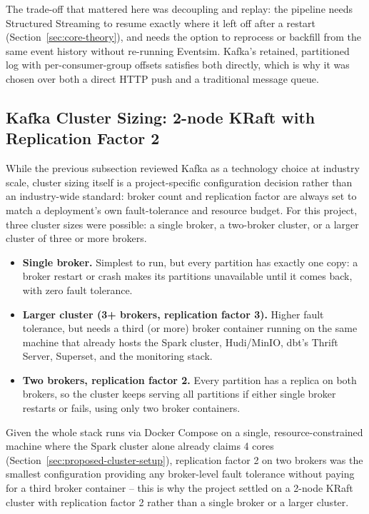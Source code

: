 The trade-off that mattered here was decoupling and replay: the pipeline needs Structured Streaming to resume exactly where it left off after a restart (Section~\ref{sec:core-theory}), and needs the option to reprocess or backfill from the same event history without re-running Eventsim. Kafka's retained, partitioned log with per-consumer-group offsets satisfies both directly, which is why it was chosen over both a direct HTTP push and a traditional message queue.

\subsection{Kafka Cluster Sizing: 2-node KRaft with Replication Factor 2}
\label{sec:kafka-sizing}

While the previous subsection reviewed Kafka as a technology choice at industry scale, cluster sizing itself is a project-specific configuration decision rather than an industry-wide standard: broker count and replication factor are always set to match a deployment's own fault-tolerance and resource budget. For this project, three cluster sizes were possible: a single broker, a two-broker cluster, or a larger cluster of three or more brokers.

\begin{itemize}
    \item \textbf{Single broker.} Simplest to run, but every partition has exactly one copy: a broker restart or crash makes its partitions unavailable until it comes back, with zero fault tolerance.
    \item \textbf{Larger cluster (3+ brokers, replication factor 3).} Higher fault tolerance, but needs a third (or more) broker container running on the same machine that already hosts the Spark cluster, Hudi/MinIO, dbt's Thrift Server, Superset, and the monitoring stack.
    \item \textbf{Two brokers, replication factor 2.} Every partition has a replica on both brokers, so the cluster keeps serving all partitions if either single broker restarts or fails, using only two broker containers.
\end{itemize}

Given the whole stack runs via Docker Compose on a single, resource-constrained machine where the Spark cluster alone already claims 4 cores (Section~\ref{sec:proposed-cluster-setup}), replication factor 2 on two brokers was the smallest configuration providing any broker-level fault tolerance without paying for a third broker container -- this is why the project settled on a 2-node KRaft cluster with replication factor 2 rather than a single broker or a larger cluster.

